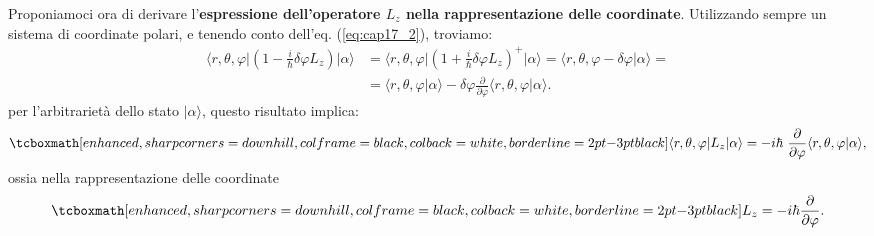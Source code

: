 \documentclass[a4paper,12pt,oneside]{book}
\begin{document}
Proponiamoci ora di derivare l'\textbf{espressione dell'operatore $L_z$ nella rappresentazione delle coordinate}. Utilizzando sempre un sistema di coordinate polari, e tenendo conto dell'eq. (\ref{eq:cap17_2}), troviamo:
	\begin{align}
		\langle r, \theta, \varphi \vert \left(1- \frac{i}{\hbar}\delta \varphi L_z\right) \vert \alpha\rangle &= \langle r, \theta, \varphi \vert \left(1+ \frac{i}{\hbar}\delta \varphi L_z\right) ^+ \vert \alpha\rangle =  \langle r, \theta, \varphi - \delta \varphi \vert\alpha\rangle  = \nonumber \\
		&= \langle r, \theta, \varphi \vert \alpha\rangle - \delta \varphi \frac{\partial}{\partial \varphi}\langle r, \theta, \varphi \vert\alpha\rangle .
	\end{align}
per l'arbitrarietà dello stato $\vert \alpha \rangle$, questo risultato implica:
	\begin{equation}
		\tcboxmath[enhanced, sharp corners=downhill, colframe=black, colback=white, borderline={2pt}{-3pt}{black}]{
			\langle r, \theta, \varphi \vert  L_z \vert \alpha\rangle =- i\hbar\ \frac{\partial}{\partial \varphi}\langle r, \theta, \varphi \vert\alpha\rangle ,
			}
	\end{equation}
ossia nella rappresentazione delle coordinate
	\begin{equation}
		\tcboxmath[enhanced, sharp corners=downhill, colframe=black, colback=white, borderline={2pt}{-3pt}{black}]{
			L_z = -i\hbar \frac{\partial}{\partial \varphi}.
			}
	\label{eq:cap17_4}
	\end{equation}\\
	
\end{document}
